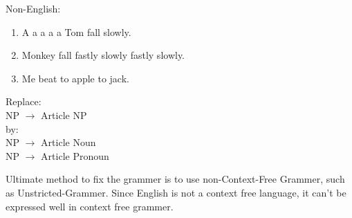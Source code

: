 \documentclass[paper=a4, fontsize=11pt]{scrartcl} %
\begin{document}
Non-English:
\begin{enumerate}
\item A a a a a Tom fall slowly.
\item Monkey fall fastly slowly fastly slowly.
\item Me beat to apple to jack.
\end{enumerate}

Replace:\\
NP $\rightarrow$ Article NP\\
by:\\
NP $\rightarrow$ Article Noun\\
NP $\rightarrow$ Article Pronoun


Ultimate method to fix the grammer is to use non-Context-Free Grammer,
such as Unstricted-Grammer.
Since English is not a context free language, it can't be expressed
well in context free grammer.

\end{document}
